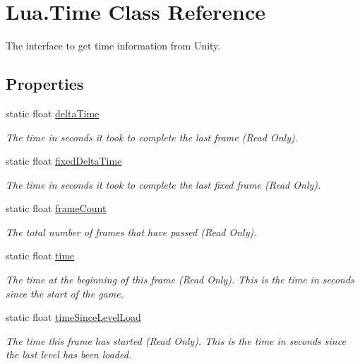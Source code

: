 \hypertarget{class_lua_1_1_time}{}\section{Lua.\+Time Class Reference}
\label{class_lua_1_1_time}


The interface to get time information from Unity.  


\subsection*{Properties}
\begin{DoxyCompactItemize}
\item 
static float \mbox{\hyperlink{class_lua_1_1_time_a0c34615f0ecde357e396cab65ecd4428}{delta\+Time}}
\begin{DoxyCompactList}\small\item\em The time in seconds it took to complete the last frame (Read Only). \end{DoxyCompactList}\item 
static float \mbox{\hyperlink{class_lua_1_1_time_a8b9eb6a7ddf143242c72e6e9378604c6}{fixed\+Delta\+Time}}
\begin{DoxyCompactList}\small\item\em The time in seconds it took to complete the last fixed frame (Read Only). \end{DoxyCompactList}\item 
static float \mbox{\hyperlink{class_lua_1_1_time_ae821e279218bd2e418f6bafc2e66cc4f}{frame\+Count}}
\begin{DoxyCompactList}\small\item\em The total number of frames that have passed (Read Only). \end{DoxyCompactList}\item 
static float \mbox{\hyperlink{class_lua_1_1_time_a6a7753473015073c35d5ae5bc4edfdf3}{time}}
\begin{DoxyCompactList}\small\item\em The time at the beginning of this frame (Read Only). This is the time in seconds since the start of the game. \end{DoxyCompactList}\item 
static float \mbox{\hyperlink{class_lua_1_1_time_af1a087ea59af5ee339aa26ae49c13370}{time\+Since\+Level\+Load}}
\begin{DoxyCompactList}\small\item\em The time this frame has started (Read Only). This is the time in seconds since the last level has been loaded. \end{DoxyCompactList}\end{DoxyCompactItemize}


